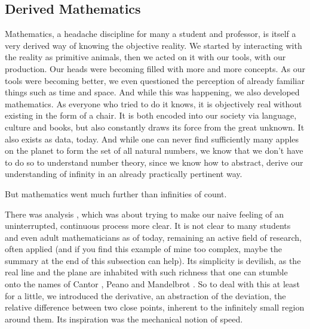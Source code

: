 \documentclass{article}
\begin{document}
\subsection*{Derived Mathematics}

Mathematics, a headache discipline for many a student and professor, is itself a very derived way of knowing the objective reality. We started by interacting with the reality as primitive animals, then we acted on it with our tools, with our production. Our heads were becoming filled with more and more concepts. As our tools were becoming better, we even questioned the perception of already familiar things such as time and space. And while this was happening, we also developed mathematics. As everyone who tried to do it knows, it is objectively real without existing in the form of a chair. It is both encoded into our society via language, culture and books, but also constantly draws its force from the great unknown. It also exists as data, today. And while one can never find sufficiently many apples on the planet to form the set of all natural numbers, we know that we don’t have to do so to understand number theory, since we know how to abstract, derive our understanding of infinity in an already practically pertinent way.

But mathematics went much further than infinities of count.

There was analysis \cite{ANALYSIS}, which was about trying to make our naive feeling of an uninterrupted, continuous process more clear. It is not clear to many students and even adult mathematicians as of today, remaining an active field of research, often applied (and if you find this example of mine too complex, maybe the summary at the end of this subsection can help). Its simplicity is devilish, as the real line and the plane are inhabited with such richness that one can stumble onto the names of Cantor \cite{CANTOR}, Peano \cite{PEANO} and Mandelbrot
\cite{MANDELBROT}. So to deal with this at least for a little, we introduced the derivative, an abstraction of the deviation, the relative difference between two close points, inherent to the infinitely small region around them. Its inspiration was the mechanical notion of speed.
\end{document}
